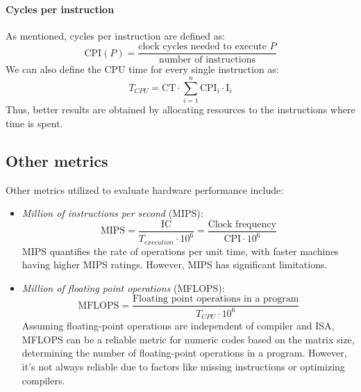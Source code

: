 \paragraph*{Cycles per instruction}
As mentioned, cycles per instruction are defined as:
\[\text{CPI}(P)=\dfrac{\text{clock cycles needed to execute }P}{\text{number of instructions}}\]
We can also define the CPU time for every single instruction as:
\[T_{CPU}=\text{CT} \cdot \sum_{i=1}^{n}\text{CPI}_i \cdot \text{I}_i\]
Thus, better results are obtained by allocating resources to the instructions where time is spent.

\subsection{Other metrics}
Other metrics utilized to evaluate hardware performance include:
\begin{itemize}
    \item \textit{Million of instructions per second} (MIPS): 
        \[\text{MIPS}=\dfrac{\text{IC}}{T_{execution} \cdot 10^6}=\dfrac{\text{Clock frequency}}{\text{CPI} \cdot 10^6}\]
        MIPS quantifies the rate of operations per unit time, with faster machines having higher MIPS ratings. 
        However, MIPS has significant limitations.
    \item \textit{Million of floating point operations} (MFLOPS): 
        \[\text{MFLOPS}=\dfrac{\text{Floating point operations in a program}}{T_{CPU} \cdot 10^6}\]
        Assuming floating-point operations are independent of compiler and ISA, MFLOPS can be a reliable metric for numeric codes based on the matrix size, determining the number of floating-point operations in a program. 
        However, it's not always reliable due to factors like missing instructions or optimizing compilers.
\end{itemize}